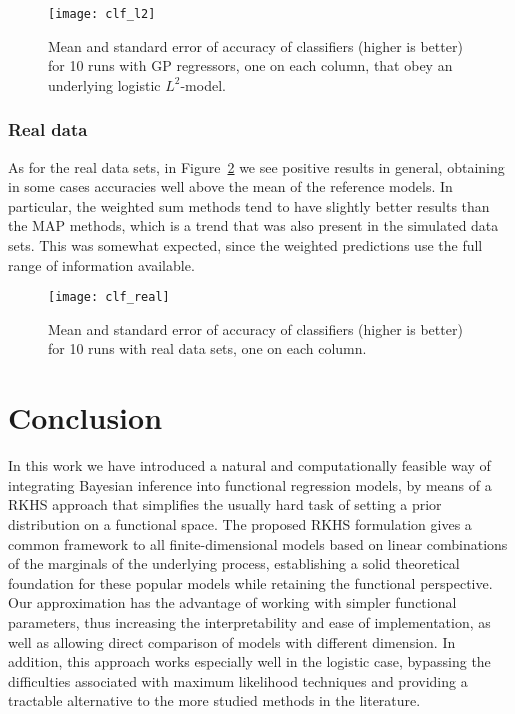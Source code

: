 \documentclass{article}
\numberwithin{equation}{section}
\theoremstyle{plain}
\theoremstyle{definition}
\begin{document}
\begin{figure}[ht!]
  \centering
  \texttt{[image: clf\_l2]}
  \caption{Mean and standard error of accuracy of classifiers (higher is better) for 10 runs with GP regressors, one on each column, that obey an underlying logistic \(L^2\)-model.}\label{fig:clf_l2}
\end{figure}

\subsubsection*{Real data}

As for the real data sets, in Figure~\ref{fig:clf_real} we see positive results in general, obtaining in some cases accuracies well above the mean of the reference models. In particular, the weighted sum methods tend to have slightly better results than the MAP methods, which is a trend that was also present in the simulated data sets. This was somewhat expected, since the weighted predictions use the full range of information available.

\begin{figure}[ht!]
  \centering
  \texttt{[image: clf\_real]}
  \caption{Mean and standard error of accuracy of classifiers (higher is better) for 10 runs with real data sets, one on each column.}\label{fig:clf_real}
\end{figure}


\section{Conclusion}\label{sec:conclusion}

In this work we have introduced a natural and computationally feasible way of integrating Bayesian inference into functional regression models, by means of a RKHS approach that simplifies the usually hard task of setting a prior distribution on a functional space. The proposed RKHS formulation gives a common framework to all finite-dimensional models based on linear combinations of the marginals of the underlying process, establishing a solid theoretical foundation for these popular models while retaining the functional perspective. Our approximation has the advantage of working with simpler functional parameters, thus increasing the interpretability and ease of implementation, as well as allowing direct comparison of models with different dimension. In addition, this approach works especially well in the logistic case, bypassing the difficulties associated with maximum likelihood techniques and providing a tractable alternative to the more studied methods in the literature.
\end{document}

